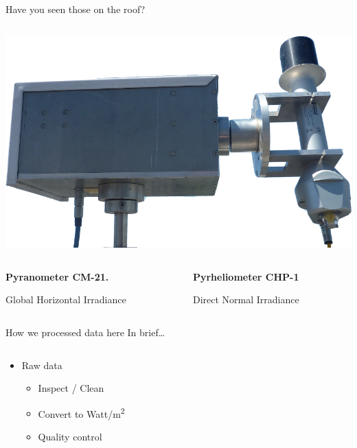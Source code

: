 \documentclass[
  ignorenonframetext,
]{beamer}
\providecommand{\tightlist}{%
  \setlength{\itemsep}{0pt}\setlength{\parskip}{0pt}}\usepackage{longtable,booktabs,array}
\begin{document}
\begin{frame}[fragile]
\begin{block}{Have you seen those on the roof?}
\begin{columns}[T]
\begin{column}{0.5\textwidth}
\includegraphics{images/P1110595e2.png}
\end{column}
\end{columns}

\begin{columns}[T]
\begin{column}{0.5\textwidth}
\textbf{Pyranometer CM-21.}

Global Horizontal Irradiance
\end{column}

\begin{column}{0.5\textwidth}
\textbf{Pyrheliometer CHP-1}

Direct Normal Irradiance
\end{column}
\end{columns}
\end{block}

\begin{block}{How we processed data here}
\protect\hypertarget{how-we-processed-data-here}{}
In brief\ldots{}

\begin{columns}[T]
\begin{column}{0.5\textwidth}
\begin{itemize}
\tightlist
\item
  Raw data

  \begin{itemize}
  \tightlist
  \item
    Inspect / Clean
  \item
    Convert to Watt/m\textsuperscript{2}
  \item
    Quality control
  \end{itemize}
\end{itemize}
\end{column}


\end{columns}
\end{block}
\end{frame}
\end{document}
